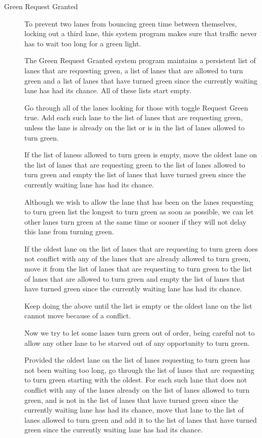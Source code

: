 \documentclass[letterpaper,twoside]{article}
\begin{document}
\begin{description}
\item [Green Request Granted]

  To prevent two lanes from bouncing green time between
  themselves, locking out a third lane,
  this system program makes sure that
  traffic never has to wait too long for a green light.

  The Green Request Granted system program maintains a persistent list of
  lanes that are requesting green,
  a list of lanes that are allowed to turn green
  and a list of lanes that have turned green since the
  currently waiting lane has had its chance.
  All of these lists start empty.

  Go through all of the lanes
  looking for those with toggle Request
  Green true.  Add each such lane to the list of
  lanes that are requesting green,
  unless the lane is already on
  the list or is in the list of lanes allowed to turn green.

  If the list of laness allowed to turn green is empty, move the
  oldest lane on the list of lanes
  that are requesting green to the list of lanes allowed to
  turn green and empty the list
  of lanes that have turned green since the currently waiting
  lane has had its chance.

  Although we wish to allow the lane that has been on the
  lanes requesting to turn green list the longest to turn green
  as soon as possible, we can let other lanes turn green
  at the same time or sooner if they will not delay this lane
  from turning green.

  If the oldest lane on the list of lanes
  that are requesting to turn green does not conflict with any of the
  lanes that are already allowed to turn green,
  move it from the list of lanes that are requesting
  to turn green to the list of lanes that are allowed
  to turn green and empty the list of lanes that have
  turned green since the currently waiting lane has had
  its chance.

  Keep doing the above until the list is empty or the oldest lane
  on the list cannot move because of a conflict.

  Now we try to let some lanes turn green out of order, being
  careful not to allow any other lane to be starved out of any
  opportunity to turn green.

  Provided the oldest lane on the list of lanes
  requesting to turn green has not been waiting too long,
  go through the list of lanes that are requesting
  to turn green starting with the oldest.
  For each such lane that does not
  conflict with any of the lanes already on the list of
  lanes allowed to turn green, and is not in the list of
  lanes that have turned green since the currently waiting
  lane has had its chance, move that lane
  to the list of lanes allowed to turn green and add it to
  the list of lanes that have
  turned green since the currently waiting lane has had its
  chance.


\end{description}
\end{document}
